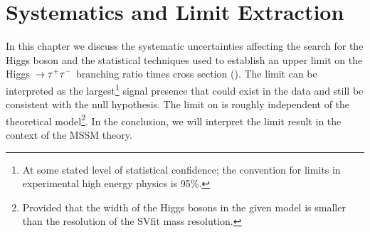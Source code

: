 \ifx\master\undefined\fi

\chapter{Systematics and Limit Extraction} \label{ch:systematics} 
%
In this chapter we discuss the systematic uncertainties affecting the search for
the Higgs boson and the statistical techniques used to establish an upper limit
on the Higgs~$\to\tau^+\tau^-$ branching ratio times cross section (\xbr).  The limit can
be interpreted as the largest\footnote{At some stated level of statistical
confidence; the convention for limits in experimental high energy physics
is 95\%.} signal presence that could exist in the data and still be consistent
with the null hypothesis.  The limit on \xbr is roughly independent of the
theoretical model\footnote{Provided that the width of the Higgs bosons in the
given model is smaller than the resolution of the SVfit mass resolution.}.  In
the conclusion, we will interpret the \xbr limit result in the context of the
MSSM theory.

